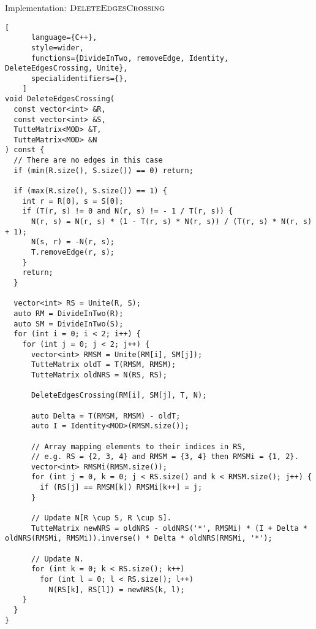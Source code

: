 \begin{programruledcaption}{Implementation: \(\textsc{DeleteEdgesCrossing}\)}
    \begin{lstlisting}[
      language={C++},
      style=wider,
      functions={DivideInTwo, removeEdge, Identity, DeleteEdgesCrossing, Unite},
      specialidentifiers={},
    ]
void DeleteEdgesCrossing(
  const vector<int> &R, 
  const vector<int> &S,
  TutteMatrix<MOD> &T,
  TutteMatrix<MOD> &N
) const {
  // There are no edges in this case
  if (min(R.size(), S.size()) == 0) return;

  if (max(R.size(), S.size()) == 1) {
    int r = R[0], s = S[0];
    if (T(r, s) != 0 and N(r, s) != - 1 / T(r, s)) {
      N(r, s) = N(r, s) * (1 - T(r, s) * N(r, s)) / (T(r, s) * N(r, s) + 1);
      N(s, r) = -N(r, s);
      T.removeEdge(r, s);
    }
    return;
  } 

  vector<int> RS = Unite(R, S);
  auto RM = DivideInTwo(R);
  auto SM = DivideInTwo(S);
  for (int i = 0; i < 2; i++) {
    for (int j = 0; j < 2; j++) {
      vector<int> RMSM = Unite(RM[i], SM[j]);
      TutteMatrix oldT = T(RMSM, RMSM);
      TutteMatrix oldNRS = N(RS, RS);

      DeleteEdgesCrossing(RM[i], SM[j], T, N);

      auto Delta = T(RMSM, RMSM) - oldT;
      auto I = Identity<MOD>(RMSM.size());

      // Array mapping elements to their indices in RS,
      // e.g. RS = {2, 3, 4} and RMSM = {3, 4} then RMSMi = {1, 2}.
      vector<int> RMSMi(RMSM.size());
      for (int j = 0, k = 0; j < RS.size() and k < RMSM.size(); j++) {
        if (RS[j] == RMSM[k]) RMSMi[k++] = j;
      }

      // Update N[R \cup S, R \cup S].
      TutteMatrix newNRS = oldNRS - oldNRS('*', RMSMi) * (I + Delta * oldNRS(RMSMi, RMSMi)).inverse() * Delta * oldNRS(RMSMi, '*');

      // Update N.
      for (int k = 0; k < RS.size(); k++)
        for (int l = 0; l < RS.size(); l++)
          N(RS[k], RS[l]) = newNRS(k, l);
    }
  }
}
    \end{lstlisting}
\end{programruledcaption}

